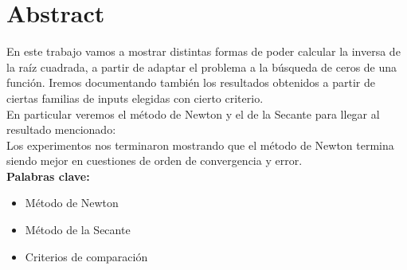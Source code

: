 \documentclass[10pt,a4paper]{article}
\begin{document}

\fecha{\today}





\maketitle

\section{Abstract}
En este trabajo vamos a mostrar distintas formas de poder calcular la inversa de la raíz cuadrada, a partir de adaptar el problema a la búsqueda de ceros de una función. Iremos documentando también los resultados obtenidos a partir de ciertas familias de inputs elegidas con cierto criterio.\\

En particular veremos el método de Newton y el de la Secante para llegar al resultado mencionado:\\

Los experimentos nos terminaron mostrando que el método de Newton termina siendo mejor en cuestiones de orden de convergencia y error.\\

{\bf Palabras clave:}
\begin{itemize}
    \item Método de Newton
    \item Método de la Secante
    \item Criterios de comparación
\end{itemize}
\end{document}
